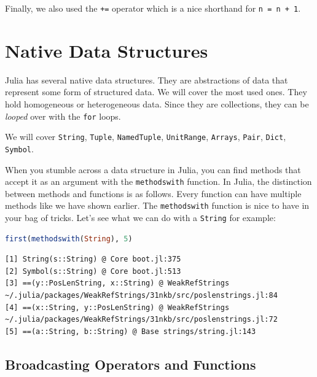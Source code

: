 \documentclass[
  notoc %
]{tufte-book}
\newcommand{\passthrough}[1]{#1}
\begin{document}
Finally, we also used the \passthrough{\lstinline!+=!} operator which is
a nice shorthand for \passthrough{\lstinline!n = n + 1!}.

\hypertarget{sec:data_structures}{%
\section{Native Data Structures}\label{sec:data_structures}}

Julia has several native data structures. They are abstractions of data
that represent some form of structured data. We will cover the most used
ones. They hold homogeneous or heterogeneous data. Since they are
collections, they can be \emph{looped} over with the
\passthrough{\lstinline!for!} loops.

We will cover \passthrough{\lstinline!String!},
\passthrough{\lstinline!Tuple!}, \passthrough{\lstinline!NamedTuple!},
\passthrough{\lstinline!UnitRange!}, \passthrough{\lstinline!Arrays!},
\passthrough{\lstinline!Pair!}, \passthrough{\lstinline!Dict!},
\passthrough{\lstinline!Symbol!}.

When you stumble across a data structure in Julia, you can find methods
that accept it as an argument with the
\passthrough{\lstinline!methodswith!} function. In Julia, the
distinction between methods and functions is as follows. Every function
can have multiple methods like we have shown earlier. The
\passthrough{\lstinline!methodswith!} function is nice to have in your
bag of tricks. Let's see what we can do with a
\passthrough{\lstinline!String!} for example:

\begin{lstlisting}[language=Julia]
first(methodswith(String), 5)
\end{lstlisting}

\begin{lstlisting}[language=Output]
[1] String(s::String) @ Core boot.jl:375
[2] Symbol(s::String) @ Core boot.jl:513
[3] ==(y::PosLenString, x::String) @ WeakRefStrings ~/.julia/packages/WeakRefStrings/31nkb/src/poslenstrings.jl:84
[4] ==(x::String, y::PosLenString) @ WeakRefStrings ~/.julia/packages/WeakRefStrings/31nkb/src/poslenstrings.jl:72
[5] ==(a::String, b::String) @ Base strings/string.jl:143
\end{lstlisting}

\hypertarget{sec:broadcasting}{%
\subsection{Broadcasting Operators and
Functions}\label{sec:broadcasting}}
\end{document}
